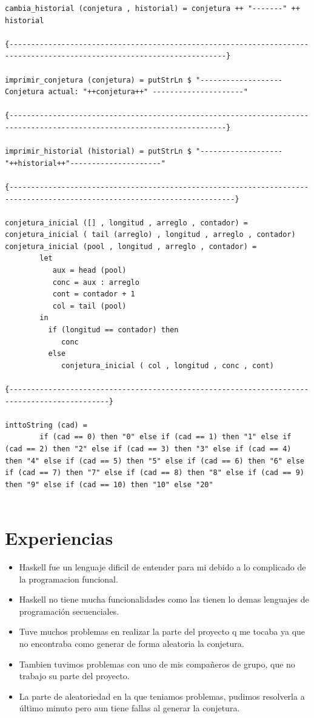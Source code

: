 \begin{itemize}
\begin{verbatim}
cambia_historial (conjetura , historial) = conjetura ++ "-------" ++ historial 

{------------------------------------------------------------------------------------------------------------------------}

imprimir_conjetura (conjetura) = putStrLn $ "-------------------Conjetura actual: "++conjetura++" ---------------------"

{------------------------------------------------------------------------------------------------------------------------}

imprimir_historial (historial) = putStrLn $ "------------------- "++historial++"---------------------"

{--------------------------------------------------------------------------------------------------------------------------}

conjetura_inicial ([] , longitud , arreglo , contador) = conjetura_inicial ( tail (arreglo) , longitud , arreglo , contador)
conjetura_inicial (pool , longitud , arreglo , contador) = 
        let
           aux = head (pool)
           conc = aux : arreglo
           cont = contador + 1
           col = tail (pool)
        in
          if (longitud == contador) then
             conc
          else
             conjetura_inicial ( col , longitud , conc , cont)
         
{---------------------------------------------------------------------------------------------}

inttoString (cad) =
        if (cad == 0) then "0" else if (cad == 1) then "1" else if (cad == 2) then "2" else if (cad == 3) then "3" else if (cad == 4) then "4" else if (cad == 5) then "5" else if (cad == 6) then "6" else if (cad == 7) then "7" else if (cad == 8) then "8" else if (cad == 9) then "9" else if (cad == 10) then "10" else "20"


     \end{verbatim}

  \end{itemize}

\section{Experiencias}
\begin{itemize}
\item Haskell fue un lenguaje dificil de entender para mi debido a lo complicado de la programacion funcional.
\item Haskell no tiene mucha funcionalidades como las tienen lo demas lenguajes de programación secuenciales.
\item Tuve muchos problemas en realizar la parte del proyecto q me tocaba ya que no encontraba como generar de forma aleatoria la conjetura.
\item Tambien tuvimos problemas con uno de mis compañeros de grupo, que no trabajo su parte del proyecto.
\item La parte de aleatoriedad en la que teniamos problemas, pudimos resolverla a último minuto pero aun tiene fallas al generar la conjetura.
 \end{itemize}
